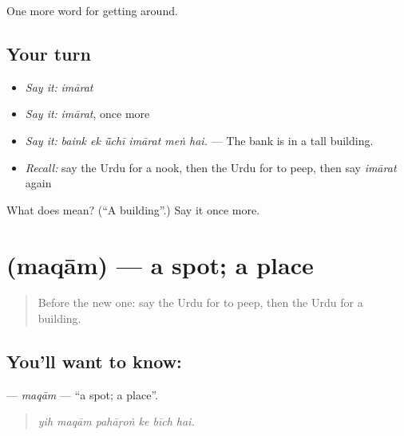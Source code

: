 \begin{grammarlens}[title={What you've built}]
One more word for getting around.
\end{grammarlens}

\subsection*{Your turn}
\begin{itemize}
\raggedright
  \item \emph{Say it:} \emph{imārat}
  \item \emph{Say it:} \emph{imārat}, once more
  \item \emph{Say it:} \emph{baink ek ū̃chī imārat meṅ hai.} — The bank is in a tall building.
  \item \emph{Recall:} say the Urdu for a nook, then the Urdu for to peep, then say \emph{imārat} again
\end{itemize}

\begin{tcolorbox}[breakable,colback=teal!4,colframe=teal!35!black,title={Before you move on}]
What does  mean? (\textquotedblleft{}A building\textquotedblright{}.) Say it once more.
\end{tcolorbox}
\section[\texorpdfstring{\ur{مقام} (maqām)}{مقام (maqām)}]{ (maqām) — a spot; a place}

\label{lesson:UR-C410-maqam}



\begin{quote}
Before the new one: say the Urdu for to peep, then the Urdu for a building.
\end{quote}

\subsection*{You'll want to know: }
\textbf{} — \emph{maqām} — \textquotedblleft{}a spot; a place\textquotedblright{}.

\begin{quote}
     
\end{quote}

\begin{quote}
\emph{yih maqām pahāṛoṅ ke bīch hai.}
\end{quote}

